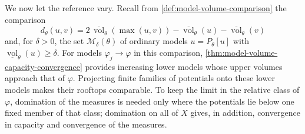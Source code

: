 We now let the reference vary. Recall from \cref{def:model-volume-comparison} the comparison
\[
 d_\theta(u,v)=2\,\overline{\operatorname{vol}}_\theta(\max(u,v))
 -\overline{\operatorname{vol}}_\theta(u)-\overline{\operatorname{vol}}_\theta(v)
\]
and, for $\delta>0$, the set $\mathcal M_\delta(\theta)$ of ordinary models $u=P_\theta[u]$ with $\underline{\operatorname{vol}}_\theta(u)\geq\delta$. For models $\varphi_j\to\varphi$ in this comparison, \cref{thm:model-volume-capacity-convergence} provides increasing lower models whose upper volumes approach that of $\varphi$. Projecting finite families of potentials onto these lower models makes their rooftops comparable. To keep the limit in the relative class of $\varphi$, domination of the measures is needed only where the potentials lie below one fixed member of that class; domination on all of $X$ gives, in addition, convergence in capacity and convergence of the measures.

